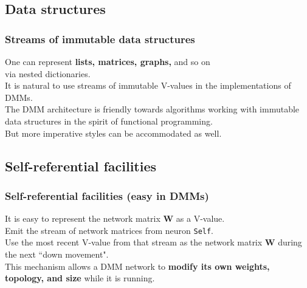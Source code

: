 \documentclass{beamer}
\newcommand{\msmagenta}[1]{{\color{mymagenta} #1}}
\begin{document}
\subsection{Data structures}





\begin{frame}

  \frametitle{Streams of immutable \msmagenta{data structures}}

One can represent {\bf lists, matrices, graphs,} and so on\\ via nested dictionaries.\\[3ex]


It is natural to use streams of immutable V-values in the implementations of DMMs.\\[3ex]

The DMM architecture is friendly towards algorithms working with immutable data structures in
the spirit of functional programming.\\[3ex]

But more imperative styles can be accommodated as well.

\end{frame}





\subsection{Self-referential facilities}





\begin{frame}

  \frametitle{\msmagenta{Self-referential facilities (easy in DMMs)}}

It is easy to represent the network matrix {\bf W} as a V-value.\\[3ex]

Emit the stream
of network matrices from neuron {\tt Self}.\\[3ex]

Use the most recent V-value from that stream
as the network matrix {\bf W} during the
next ``down movement".\\[3ex]

This mechanism allows a DMM network to 
{\bf modify its own weights, topology, and size}
while it is running.

\end{frame}
\end{document}
